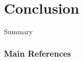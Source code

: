 \documentclass[10pt]{beamer}
\begin{document}
\section{Conclusion}

  \begin{frame}{Summary}
    \begin{center}\ccbysa\end{center}
  \end{frame}
  


  \begin{frame}[allowframebreaks]\frametitle{Main References}

    
    

  \end{frame}
\end{document}
